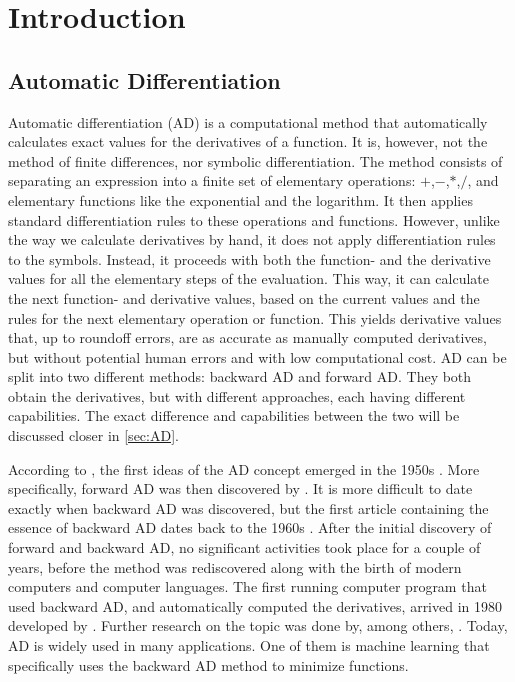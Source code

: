 \chapter{Introduction}
\section{Automatic Differentiation}
Automatic differentiation (AD) is a computational method that automatically calculates exact values for the derivatives of a function. It is, however, not the method of finite differences, nor symbolic differentiation. The method consists of separating an expression into a finite set of elementary operations: $+$,$-$,$*$,$/$, and elementary functions like the exponential and the logarithm. It then applies standard differentiation rules to these operations and functions. However, unlike the way we calculate derivatives by hand, it does not apply differentiation rules to the symbols. Instead, it proceeds with both the function- and the derivative values for all the elementary steps of the evaluation. This way, it can calculate the next function- and derivative values, based on the current values and the rules for the next elementary operation or function. This yields derivative values that, up to roundoff errors, are as accurate as manually computed derivatives, but without potential human errors and with low computational cost. AD can be split into two different methods: backward AD and forward AD. They both obtain the derivatives, but with different approaches, each having different capabilities. The exact difference and capabilities between the two will be discussed closer in \autoref{sec:AD}. 

According to \cite{SurveyAD}, the first ideas of the AD concept emerged in the 1950s \citep{nolan1953analytical, beda1959programs}. More specifically, forward AD was then discovered by \citet{wengert1964simple}. It is more difficult to date exactly when backward AD was discovered, but the first article containing the essence of backward AD dates back to the 1960s \citep{boltyanskii1960theory}. After the initial discovery of forward and backward AD, no significant activities took place for a couple of years, before the method was rediscovered along with the birth of modern computers and computer languages. The first running computer program that used backward AD, and automatically computed the derivatives, arrived in 1980 developed by \citet{speelpenning1980compiling}. Further research on the topic was done by, among others, \citet{griewank1989automatic}. Today, AD is widely used in many applications. One of them is machine learning that specifically uses the backward AD method to minimize functions. 

